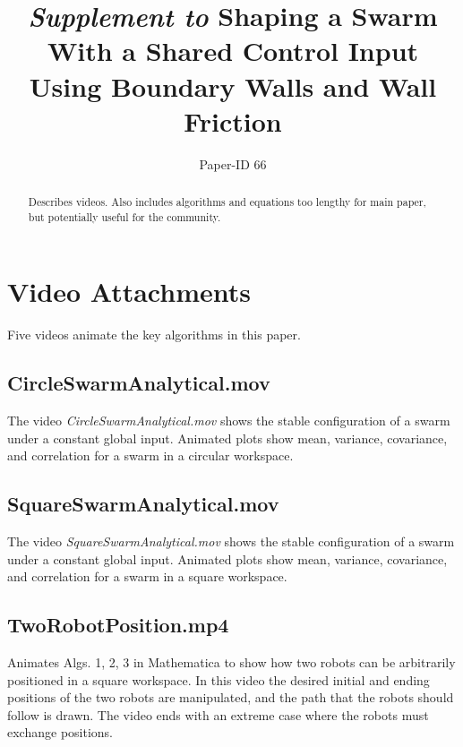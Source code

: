 \documentclass[conference]{IEEEtran}
\begin{document}
\title{\large{ \emph{Supplement to} 
Shaping a Swarm With a Shared Control Input\\ Using Boundary Walls and Wall Friction}}

\author{Paper-ID 66}


\maketitle

\begin{abstract}
Describes videos.
Also includes algorithms and equations too lengthy for main paper, but potentially useful for the community.
\end{abstract}

\IEEEpeerreviewmaketitle

\section{Video Attachments}
Five videos animate the key algorithms in this paper.

\subsection{CircleSwarmAnalytical.mov}
The video \emph{CircleSwarmAnalytical.mov} shows the stable configuration of a swarm under a constant global input.  Animated plots show mean, variance, covariance, and correlation for a swarm in a circular workspace.

\subsection{SquareSwarmAnalytical.mov}
The video \emph{SquareSwarmAnalytical.mov} shows the stable configuration of a swarm under a constant global input.  Animated plots show mean, variance, covariance, and correlation for a swarm in a square workspace.

\subsection{TwoRobotPosition.mp4}
Animates Algs. 1, 2, 3 in Mathematica to show how two robots can be arbitrarily positioned in a square workspace. In this video the desired initial and ending positions of the two robots are manipulated, and the path that the robots should follow is drawn. The video ends with an extreme case where the robots must exchange positions. 
\end{document}
